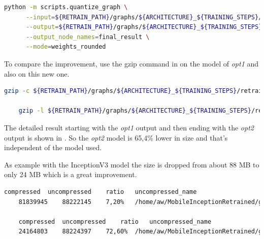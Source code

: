 \begin{minipage}{\linewidth}
\begin{lstlisting}[caption=Call of \textit{quantize_graph.py}, label=list:quantize_graph, language=bash]
	python -m scripts.quantize_graph \
	  --input=${RETRAIN_PATH}/graphs/${ARCHITECTURE}_${TRAINING_STEPS}/opt1_retrained_dog_graph_${ARCHITECTURE}_${TRAINING_STEPS}_${LEARNING_RATE}.pb \
	  --output=${RETRAIN_PATH}/graphs/${ARCHITECTURE}_${TRAINING_STEPS}/opt2_retrained_dog_graph_${ARCHITECTURE}_${TRAINING_STEPS}_${LEARNING_RATE}.pb \
	  --output_node_names=final_result \
	  --mode=weights_rounded
\end{lstlisting}
\end{minipage}

To compare the improvement, use the gzip command in  on the model of \textit{opt1} and also on this new one. 

\begin{minipage}{\linewidth}
\begin{lstlisting}[caption=Call of gzip, label=list:gzip, language=bash]
	gzip -c ${RETRAIN_PATH}/graphs/${ARCHITECTURE}_${TRAINING_STEPS}/retrained_dog_graph_${ARCHITECTURE}_${TRAINING_STEPS}_${LEARNING_RATE}.pb > ${RETRAIN_PATH}/graphs/${ARCHITECTURE}_${TRAINING_STEPS}/retrained_dog_graph_${ARCHITECTURE}_${TRAINING_STEPS}_${LEARNING_RATE}.pb.gz

	gzip -l ${RETRAIN_PATH}/graphs/${ARCHITECTURE}_${TRAINING_STEPS}/retrained_dog_graph_${ARCHITECTURE}_${TRAINING_STEPS}_${LEARNING_RATE}.pb.gz
\end{lstlisting}
\end{minipage}

The detailed result starting with the \textit{opt1} output and then ending with the \textit{opt2} output is shown in \listref{gzip_res}. So the \textit{opt2} model is 65,4\% lower in size and that's independent of the model used. 

As example with the InceptionV3 model the size is dropped from about 88 MB to only 24 MB which is a great improvement.

\begin{minipage}{\linewidth}
\begin{lstlisting}[caption=Output of gzip, label=list:gzip_res, language=bash]
	compressed	uncompressed	ratio	uncompressed_name
	81839945	88222145	7,20%	/home/aw/MobileInceptionRetrained/graphs/inception_v3_4000/opt1_retrained_dog_graph_inception_v3_4000_0.03.pb

	compressed	uncompressed	ratio	uncompressed_name
	24164803	88224397	72,60%	/home/aw/MobileInceptionRetrained/graphs/inception_v3_4000/opt2_retrained_dog_graph_inception_v3_4000_0.03.pb
\end{lstlisting}
\end{minipage}


